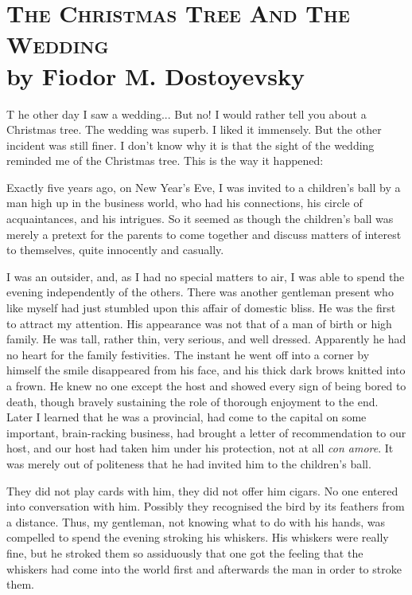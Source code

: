 \chapter{\textsc{The Christmas Tree And The Wedding}\\
\small \hspace{20pt}
by Fiodor M. Dostoyevsky}


\lettrine[lines=3,lhang=0.11,lraise=0,loversize=0.05]{T}{}%
he other day I saw a wedding... But no! I would rather tell you about
a Christmas tree. The wedding was superb. I liked it immensely. But
the other incident was still finer. I don't know why it is that the
sight of the wedding reminded me of the Christmas tree. This is the
way it happened:

Exactly five years ago, on New Year's Eve, I was invited to a
children's ball by a man high up in the business world, who had his
connections, his circle of acquaintances, and his intrigues. So it
seemed as though the children's ball was merely a pretext for the
parents to come together and discuss matters of interest to
themselves, quite innocently and casually.

I was an outsider, and, as I had no special matters to air, I was able
to spend the evening independently of the others. There was another
gentleman present who like myself had just stumbled upon this affair
of domestic bliss. He was the first to attract my attention. His
appearance was not that of a man of birth or high family. He was tall,
rather thin, very serious, and well dressed. Apparently he had no
heart for the family festivities. The instant he went off into a
corner by himself the smile disappeared from his face, and his thick
dark brows knitted into a frown. He knew no one except the host and
showed every sign of being bored to death, though bravely sustaining
the role of thorough enjoyment to the end. Later I learned that he was
a provincial, had come to the capital on some important, brain-racking
business, had brought a letter of recommendation to our host, and our
host had taken him under his protection, not at all \emph{con amore}. It
was merely out of politeness that he had invited him to the children's
ball.

They did not play cards with him, they did not offer him cigars. No
one entered into conversation with him. Possibly they recognised the
bird by its feathers from a distance. Thus, my gentleman, not knowing
what to do with his hands, was compelled to spend the evening stroking
his whiskers. His whiskers were really fine, but he stroked them so
assiduously that one got the feeling that the whiskers had come into
the world first and afterwards the man in order to stroke them.

